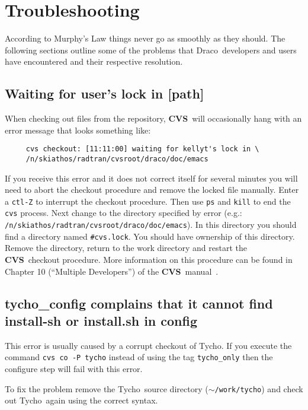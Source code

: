 \documentclass[10pt]{nmemo}
\newcommand{\comp}[1]{\normalfont\normalsize\texttt{#1}}
\newcommand{\draco}{{\normalfont\sffamily Draco}}
\newcommand{\tycho}{{\normalfont\sffamily Tycho}}
\newcommand{\cvs}{{\normalfont\bfseries CVS}}
\begin{document}
\section{Troubleshooting}

According to Murphy's Law things never go as smoothly as they should.
The following sections outline some of the problems that \draco\ 
developers and users have encountered and their respective resolution.

\subsection{Waiting for user's lock in [path]}

When checking out files from the repository, \cvs\ will occasionally
hang with an error message that looks something like:

\footnotesize
\begin{verbatim}
     cvs checkout: [11:11:00] waiting for kellyt's lock in \
     /n/skiathos/radtran/cvsroot/draco/doc/emacs
\end{verbatim}
\normalsize

If you receive this error and it does not correct itself for several
minutes you will need to abort the checkout procedure and remove the
locked file manually.  Enter a \comp{ctl-Z} to interrupt the checkout
procedure.  Then use \comp{ps} and \comp{kill} to end the \comp{cvs}
process.  Next change to the directory specified by error (e.g.:
\comp{/n/skiathos/radtran/cvsroot/draco/doc/emacs}).  In this
directory you should find a directory named \comp{\#cvs.lock}.  You
should have ownership of this directory.  Remove the directory, return
to the work directory and restart the \cvs\ checkout procedure.  More
information on this procedure can be found in Chapter 10 (``Multiple
Developers'') of the \cvs\ manual~\cite{cvs}.

\subsection{tycho\_config complains that it cannot find
  install-sh or install.sh in config}

This error is usually caused by a corrupt checkout of \tycho.  If you
execute the command \comp{cvs~co~-P~tycho} instead of using the tag
\comp{tycho\_only} then the configure step will fail with this error.  

To fix the problem remove the \tycho\ source directory
(\comp{$\sim$/work/tycho}) and check out \tycho\ again using the
correct syntax.
\end{document}
